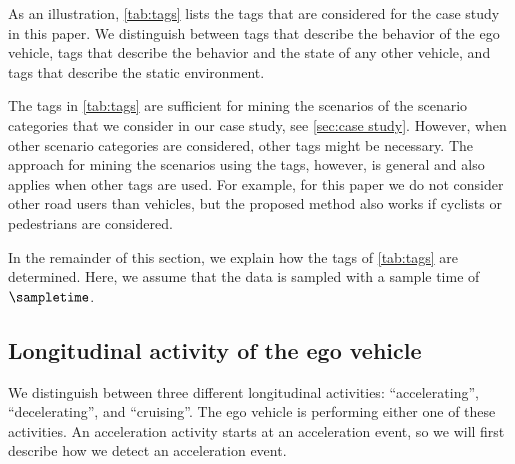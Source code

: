 \cstarta
As an illustration, \cref{tab:tags} lists the tags that are considered for the case study in this paper. 
We distinguish between tags that describe the behavior of the ego vehicle, tags that describe the behavior and the state of any other vehicle, and tags that describe the static environment. \cenda
\begin{remark}
	\cstarta The tags in \cref{tab:tags} are sufficient for mining the scenarios of the scenario categories that we consider in our case study, see \cref{sec:case study}. However, when other scenario categories are considered, other tags might be necessary. The approach for mining the scenarios using the tags, however, is general and also applies when other tags are used. \cenda 
	\cstartc For example, for this paper we do not consider other road users than vehicles, but the proposed method also works if cyclists or pedestrians are considered.\cendc
\end{remark}

In the remainder of this section, we explain how the tags of \cref{tab:tags} are determined. 
Here, we assume that the data is sampled with a sample time of $\sampletime$.



\subsection{Longitudinal activity of the ego vehicle}
\label{sec:longitudinal ego}

We distinguish between three different longitudinal activities: ``accelerating'', ``decelerating'', and ``cruising''. 
The ego vehicle is performing either one of these activities. 
\cstartc An acceleration activity starts at an acceleration event, so we will first describe how we detect an acceleration event.
\cendc

